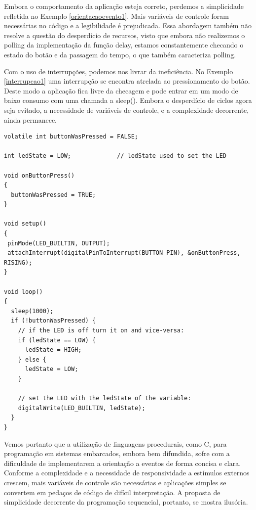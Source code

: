 \documentclass{article}
\begin{document}
\par Embora o comportamento da aplicação esteja correto, perdemos a simplicidade refletida no Exemplo \ref{orientacaoevento1}. Mais variáveis de controle foram necessárias no código e a legibilidade é prejudicada. Essa abordagem também não resolve a questão do desperdício de recursos, visto que embora não realizemos o polling da implementação da função delay, estamos constantemente checando o estado do botão e da passagem do tempo, o que também caracteriza polling.
\par Com o uso de interrupções, podemos nos livrar da ineficiência. No Exemplo \ref{interrupcao1} uma interrupção se encontra atrelada ao pressionamento do botão. Deste modo a aplicação fica livre da checagem e pode entrar em um modo de baixo consumo com uma chamada a sleep(). Embora o desperdício de ciclos agora seja evitado, a necessidade de variáveis de controle, e a complexidade decorrente, ainda permanece.
\begin{lstlisting}[style=CStyle,label=interrupcao1,caption=Aplicação utilizando interrupção]
volatile int buttonWasPressed = FALSE;

int ledState = LOW;             // ledState used to set the LED

void onButtonPress()
{
  buttonWasPressed = TRUE;
}

void setup()
{
 pinMode(LED_BUILTIN, OUTPUT);
 attachInterrupt(digitalPinToInterrupt(BUTTON_PIN), &onButtonPress, RISING);
}

void loop()
{
  sleep(1000);
  if (!buttonWasPressed) {
    // if the LED is off turn it on and vice-versa:
    if (ledState == LOW) {
      ledState = HIGH;
    } else {
      ledState = LOW;
    }

    // set the LED with the ledState of the variable:
    digitalWrite(LED_BUILTIN, ledState);
  }
}
\end{lstlisting}
\par\par Vemos portanto que a utilização de linguagens procedurais, como C, para programação em sistemas embarcados, embora bem difundida, sofre com a dificuldade de implementarem a orientação a eventos de forma concisa e clara. Conforme a complexidade e a necessidade de responsividade a estímulos externos crescem, mais variáveis de controle são necessárias e aplicações simples se convertem em pedaços de código de difícil interpretação. A proposta de simplicidade decorrente da programação sequencial, portanto, se mostra ilusória.
\end{document}
